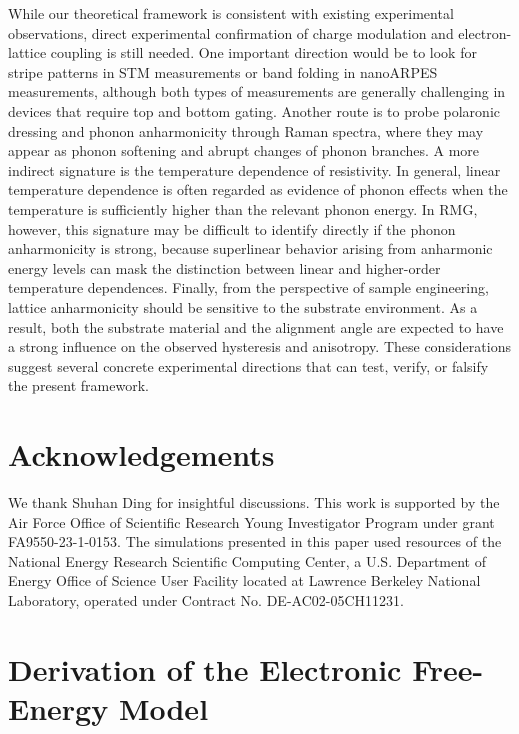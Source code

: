 \documentclass[aps,prx,article,twocolumn,amsmath,amssymb,superscriptaddress,longbibliography]{revtex4-2}
\begin{document}
While our theoretical framework is consistent with existing experimental observations, direct experimental confirmation of charge modulation and electron-lattice coupling is still needed. One important direction would be to look for stripe patterns in STM measurements or band folding in nanoARPES measurements, although both types of measurements are generally challenging in devices that require top and bottom gating. Another route is to probe polaronic dressing and phonon anharmonicity through Raman spectra, where they may appear as phonon softening and abrupt changes of phonon branches. A more indirect signature is the temperature dependence of resistivity. In general, linear temperature dependence is often regarded as evidence of phonon effects when the temperature is sufficiently higher than the relevant phonon energy. In RMG, however, this signature may be difficult to identify directly if the phonon anharmonicity is strong, because superlinear behavior arising from anharmonic energy levels can mask the distinction between linear and higher-order temperature dependences. Finally, from the perspective of sample engineering, lattice anharmonicity should be sensitive to the substrate environment. As a result, both the substrate material and the alignment angle are expected to have a strong influence on the observed hysteresis and anisotropy. These considerations suggest several concrete experimental directions that can test, verify, or falsify the present framework.



\section*{Acknowledgements}
We thank Shuhan Ding for insightful discussions. This work is supported by the Air Force Office of Scientific Research Young Investigator Program under grant FA9550-23-1-0153. The simulations presented in this paper used resources of the National Energy Research Scientific Computing Center, a U.S. Department of Energy Office of Science User Facility located at Lawrence Berkeley National Laboratory, operated under Contract No. DE-AC02-05CH11231.









\appendix


\section{Derivation of the Electronic Free-Energy Model}\label{app:derivationFreeEnergy}
\end{document}
